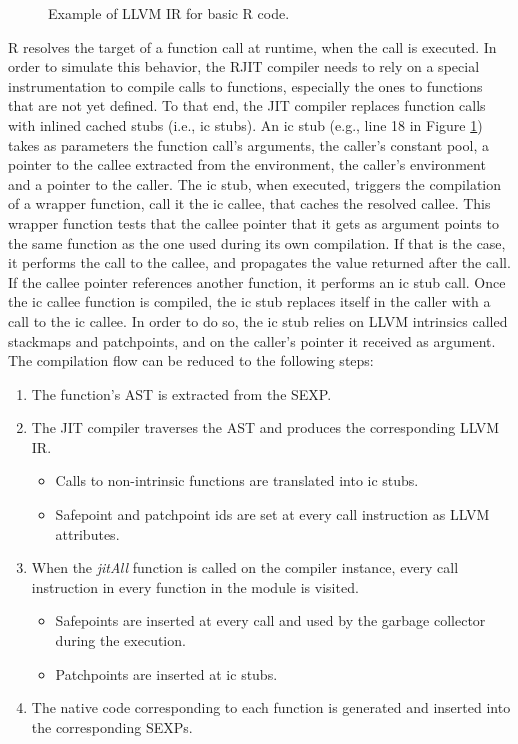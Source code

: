 \begin{figure}[h]
\caption{Example of LLVM IR for basic R code.}
\label{fig:exampleirforr}
\end{figure}

R resolves the target of a function call at runtime, when the call is executed.
In order to simulate this behavior, the RJIT compiler needs to rely on a special instrumentation to compile calls to functions, especially the ones to functions that are not yet defined.
To that end, the JIT compiler replaces function calls with inlined cached stubs (i.e., ic stubs).
An ic stub (e.g., line 18 in Figure \ref{fig:exampleirforr}) takes as parameters the function call's arguments, the caller's constant pool, a pointer to the callee extracted from the environment, the caller's environment and a pointer to the caller.
The ic stub, when executed, triggers the compilation of a wrapper function, call it the ic callee, that caches the resolved callee.
This wrapper function tests that the callee pointer that it gets as argument points to the same function as the one used during its own compilation.
If that is the case, it performs the call to the callee, and propagates the value returned after the call.
If the callee pointer references another function, it performs an ic stub call.
Once the ic callee function is compiled, the ic stub replaces itself in the caller with a call to the ic callee.
In order to do so, the ic stub relies on LLVM intrinsics called stackmaps\cite{llvmStackMap} and patchpoints\cite{llvmPatchpoints}, and on the caller's pointer it received as argument.\\

The compilation flow can be reduced to the following steps:
\begin{enumerate}
    \item The function's AST is extracted from the SEXP.
    \item The JIT compiler traverses the AST and produces the corresponding LLVM IR.
        \begin{itemize}
        \item Calls to non-intrinsic functions are translated into ic stubs.
        \item Safepoint and patchpoint ids are set at every call instruction as LLVM attributes\cite{llvmAttribute}.
        \end{itemize}
    \item When the \textit{jitAll} function is called on the compiler instance, every call instruction in every function in the module is visited.\label{jitAll}
        \begin{itemize}
        \item Safepoints are inserted at every call and used by the garbage collector during the execution.
        \item Patchpoints\cite{llvmPatchpoints} are inserted at ic stubs.
        \end{itemize}
    \item The native code corresponding to each function is generated and inserted into the corresponding SEXPs.
\end{enumerate}

